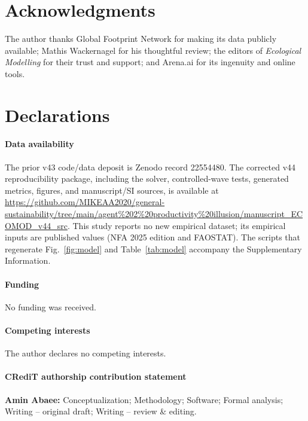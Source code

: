 \documentclass[preprint,12pt,authoryear]{elsarticle}
\begin{document}
\section*{Acknowledgments}

The author thanks Global Footprint Network for making its data publicly available; Mathis Wackernagel for his thoughtful review; the editors of \emph{Ecological Modelling} for their trust and support; and Arena.ai for its ingenuity and online tools.

\section*{Declarations}

\paragraph{Data availability} The prior v43 code/data deposit is Zenodo record 22554480. The corrected v44 reproducibility package, including the solver, controlled-wave tests, generated metrics, figures, and manuscript/SI sources, is available at \url{https://github.com/MIKEAA2020/general-sustainability/tree/main/agent%202%20productivity%20illusion/manuscript_ECOMOD_v44_src}. This study reports no new empirical dataset; its empirical inputs are published values (NFA 2025 edition and FAOSTAT). The scripts that regenerate Fig.~\ref{fig:model} and Table~\ref{tab:model} accompany the Supplementary Information.

\paragraph{Funding} No funding was received.

\paragraph{Competing interests} The author declares no competing interests.

\paragraph{CRediT authorship contribution statement} \textbf{Amin Abaee:} Conceptualization; Methodology; Software; Formal analysis; Writing -- original draft; Writing -- review \& editing.
\end{document}
